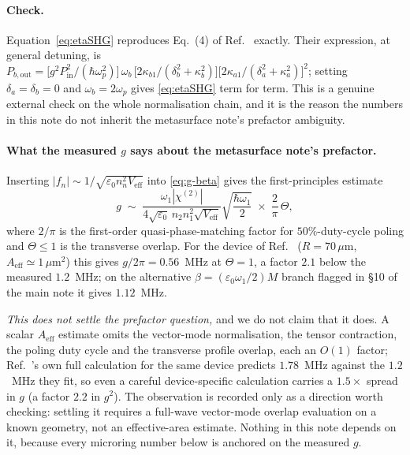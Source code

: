 \documentclass[11pt,a4paper]{article}
\newcommand{\eps}{\varepsilon}
\newcommand{\chitwo}{\chi^{(2)}}
\newcommand{\Veff}{V_{\text{eff}}}
\newcommand{\Aeff}{A_{\text{eff}}}
\begin{document}
\paragraph{Check.}  Equation~\eqref{eq:etaSHG} reproduces Eq.~(4) of
Ref.~\cite{Lu2020} exactly.  Their expression, at general detuning, is
$P_{b,\text{out}}=\bigl[g^2P_{\text{in}}^2/(\hbar\omega_p^2)\bigr]\,\omega_b\,
 \bigl[2\kappa_{b1}/(\delta_b^2+\kappa_b^2)\bigr]
 \bigl[2\kappa_{a1}/(\delta_a^2+\kappa_a^2)\bigr]^2$;
setting $\delta_a=\delta_b=0$ and $\omega_b=2\omega_p$ gives
\eqref{eq:etaSHG} term for term.  This is a genuine external check on
the whole normalisation chain, and it is the reason the numbers in this
note do not inherit the metasurface note's prefactor ambiguity.

\paragraph{What the measured $g$ says about the metasurface note's
prefactor.}  Inserting $|f_n|\sim1/\sqrt{\eps_0n_n^2\Veff}$ into
\eqref{eq:g-beta} gives the first-principles estimate
\begin{equation}
  g\;\sim\;\frac{\omega_1|\chitwo|}{4\sqrt{\eps_0}\,n_2n_1^2\sqrt{\Veff}}
          \sqrt{\frac{\hbar\omega_1}{2}}\;\times\;\frac{2}{\pi}\,\Theta ,
  \label{eq:g-geom}
\end{equation}
where $2/\pi$ is the first-order quasi-phase-matching factor for
$50\%$-duty-cycle poling and $\Theta\le1$ is the transverse overlap.
For the device of Ref.~\cite{Lu2020} ($R=70\,\mu$m, $\Aeff\simeq1\,\mu$m$^2$)
this gives $g/2\pi=0.56$~MHz at $\Theta=1$, a factor $2.1$ below the
measured $1.2$~MHz; on the alternative $\beta=(\eps_0\omega_1/2)M$
branch flagged in \S10 of the main note it gives $1.12$~MHz.

\emph{This does not settle the prefactor question,} and we do not claim
that it does.  A scalar $\Aeff$ estimate omits the vector-mode
normalisation, the tensor contraction, the poling duty cycle and the
transverse profile overlap, each an $O(1)$ factor; Ref.~\cite{Lu2020}'s
own full calculation for the same device predicts $1.78$~MHz against the
$1.2$~MHz they fit, so even a careful device-specific calculation
carries a $1.5\times$ spread in $g$ (a factor $2.2$ in $g^2$).  The
observation is recorded only as a direction worth checking: settling it
requires a full-wave vector-mode overlap evaluation on a known geometry,
not an effective-area estimate.  Nothing in this note depends on it,
because every microring number below is anchored on the measured $g$.
\end{document}
